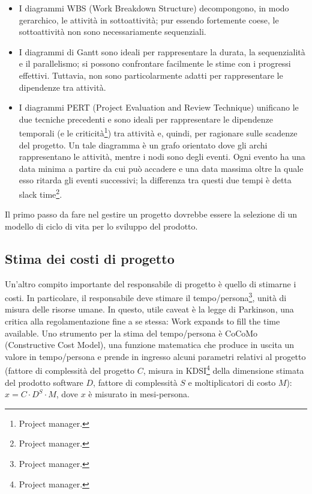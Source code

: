 \documentclass[a4paper]{article}
\begin{document}
	\begin{itemize}
		
			
	\item I diagrammi WBS (Work Breakdown Structure) decompongono, in modo gerarchico, le attività in sottoattività; pur essendo fortemente coese, le sottoattività non sono necessariamente sequenziali.
			
	\item I diagrammi di Gantt sono ideali per rappresentare la durata, la sequenzialità e il parallelismo; si possono confrontare facilmente le stime con i progressi effettivi. Tuttavia, non sono particolarmente adatti per rappresentare le dipendenze tra attività.
			
	\item I diagrammi PERT (Project Evaluation and Review Technique) unificano le due tecniche precedenti e sono ideali per rappresentare le dipendenze temporali (e le criticità\footnote{Project manager.}) tra attività e, quindi, per ragionare sulle scadenze del progetto. Un tale diagramma è un grafo orientato dove gli archi rappresentano le attività, mentre i nodi sono degli eventi. Ogni evento ha una data minima a partire da cui può accadere e una data massima oltre la quale esso ritarda gli eventi successivi; la differenza tra questi due tempi è detta slack time\footnote{Project manager.}.
		
	\end{itemize}

		
Il primo passo da fare nel gestire un progetto dovrebbe essere la selezione di un modello di ciclo di vita per lo sviluppo del prodotto.

		
	\subsection{Stima dei costi di progetto}

		
Un'altro compito importante del responsabile di progetto è quello di stimarne i costi. In particolare, il responsabile deve stimare il tempo/persona\footnote{Project manager.}, unità di misura delle risorse umane. In questo, utile caveat è la legge di Parkinson, una critica alla regolamentazione fine a se stessa: Work expands to fill the time available. Uno strumento per la stima del tempo/persona è CoCoMo (Constructive Cost Model), una funzione matematica che produce in uscita un valore in tempo/persona e prende in ingresso alcuni parametri relativi al progetto (fattore di complessità del progetto $C$, misura in KDSI\footnote{Project manager.} della dimensione stimata del prodotto software $D$, fattore di complessità $S$ e moltiplicatori di costo $M$): $x = C \cdot{} D^{S} \cdot{} M$, dove $x$ è misurato in mesi-persona.
\end{document}
